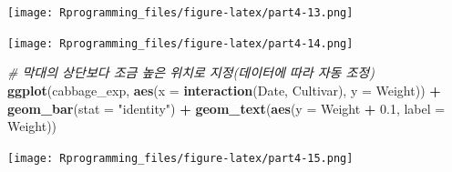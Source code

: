 \documentclass[10pt,]{krantz}
\makeatletter
\newenvironment{Shaded}{\begin{snugshade}}{\end{snugshade}}
\newcommand{\KeywordTok}[1]{\textcolor[rgb]{0.13,0.29,0.53}{\textbf{#1}}}
\newcommand{\DataTypeTok}[1]{\textcolor[rgb]{0.13,0.29,0.53}{#1}}
\newcommand{\DecValTok}[1]{\textcolor[rgb]{0.00,0.00,0.81}{#1}}
\newcommand{\FloatTok}[1]{\textcolor[rgb]{0.00,0.00,0.81}{#1}}
\newcommand{\StringTok}[1]{\textcolor[rgb]{0.31,0.60,0.02}{#1}}
\newcommand{\CommentTok}[1]{\textcolor[rgb]{0.56,0.35,0.01}{\textit{#1}}}
\newcommand{\OperatorTok}[1]{\textcolor[rgb]{0.81,0.36,0.00}{\textbf{#1}}}
\newcommand{\NormalTok}[1]{#1}
\newenvironment{kframe}{%
\medskip{}
\setlength{\fboxsep}{.8em}
 \def\at@end@of@kframe{}%
 \ifinner\ifhmode%
  \def\at@end@of@kframe{\end{minipage}}%
  \begin{minipage}{\columnwidth}%
 \fi\fi%
 \def\FrameCommand##1{\hskip\@totalleftmargin \hskip-\fboxsep
 \colorbox{shadecolor}{##1}\hskip-\fboxsep
     \hskip-\linewidth \hskip-\@totalleftmargin \hskip\columnwidth}%
 \MakeFramed {\advance\hsize-\width
   \@totalleftmargin\z@ \linewidth\hsize
   \@setminipage}}%
 {\par\unskip\endMakeFramed%
 \at@end@of@kframe}
\renewenvironment{Shaded}{\begin{kframe}}{\end{kframe}}
\theoremstyle{definition}
\theoremstyle{definition}
\theoremstyle{remark}
\makeatother
\begin{document}
\texttt{[image: Rprogramming\_files/figure-latex/part4-13.png]}

\begin{Shaded}
\end{Shaded}

\texttt{[image: Rprogramming\_files/figure-latex/part4-14.png]}

\begin{Shaded}
\begin{Highlighting}[]


\CommentTok{# 막대의 상단보다 조금 높은 위치로 지정(데이터에 따라 자동 조정)}
\KeywordTok{ggplot}\NormalTok{(cabbage_exp, }\KeywordTok{aes}\NormalTok{(}\DataTypeTok{x =} \KeywordTok{interaction}\NormalTok{(Date, Cultivar), }\DataTypeTok{y =}\NormalTok{ Weight)) }\OperatorTok{+}\StringTok{ }\KeywordTok{geom_bar}\NormalTok{(}\DataTypeTok{stat =} \StringTok{"identity"}\NormalTok{) }\OperatorTok{+}
\StringTok{  }\KeywordTok{geom_text}\NormalTok{(}\KeywordTok{aes}\NormalTok{(}\DataTypeTok{y =}\NormalTok{ Weight }\OperatorTok{+}\StringTok{ }\FloatTok{0.1}\NormalTok{, }\DataTypeTok{label =}\NormalTok{ Weight)) }
\end{Highlighting}
\end{Shaded}

\texttt{[image: Rprogramming\_files/figure-latex/part4-15.png]}
\end{document}
